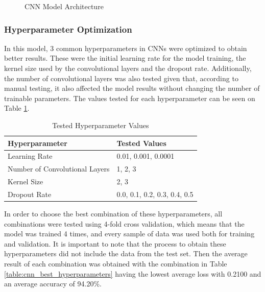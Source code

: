\begin{figure}[H]%
    \centering
    
    \caption[CNN Architecture]{CNN Model Architecture}
    \label{fig:cnn_architecture}
\end{figure}


\subsubsection{Hyperparameter Optimization}

In this model, 3 common hyperparameters in CNNs were optimized to obtain better results. These were the initial learning rate for the model training, the kernel size used by the convolutional layers and the dropout rate. Additionally, the number of convolutional layers was also tested given that, according to manual testing, it also affected the model results without changing the number of trainable parameters. The values tested for each hyperparameter can be seen on Table \ref{table:cnn_hyperparameters}.

\begin{table}[H]
\caption{Tested Hyperparameter Values}
\label{table:cnn_hyperparameters}
\centering
\begin{tabular}{|l|l|}
\hline
Hyperparameter & Tested Values \\
\hline
Learning Rate & 0.01, 0.001, 0.0001 \\
\hline
Number of Convolutional Layers & 1, 2, 3 \\
\hline
Kernel Size & 2, 3 \\
\hline
Dropout Rate & 0.0, 0.1, 0.2, 0.3, 0.4, 0.5 \\
\hline
\end{tabular}
\end{table}

In order to choose the best combination of these hyperparameters, all combinations were tested using 4-fold cross validation, which means that the model was trained 4 times, and every sample of data was used both for training and validation. It is important to note that the process to obtain these hyperparameters did not include the data from the test set. Then the average result of each combination was obtained with the combination in Table \ref{table:cnn_best_hyperparameters} having the lowest average loss with 0.2100 and an average accuracy of 94.20\%.

